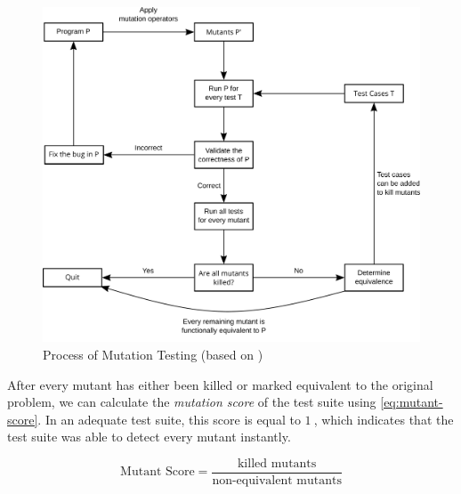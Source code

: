 \begin{figure}[htbp!]
	\centering
	\includegraphics[width=\textwidth]{assets/images/mutation-testing.pdf}
	\caption{Process of Mutation Testing (based on \cite{Offutt2001})}
	\label{fig:mutation-testing}
\end{figure}

\noindent After every mutant has either been killed or marked equivalent to the original problem, we can calculate the \emph{mutation score} of the test suite using \cref{eq:mutant-score}. In an adequate test suite, this score is equal to $\SI{1}{}$, which indicates that the test suite was able to detect every mutant instantly.

\begin{equation}\label{eq:mutant-score}
	\text{Mutant Score} = \frac{\text{killed mutants}}{\text{non-equivalent mutants}}
\end{equation}

